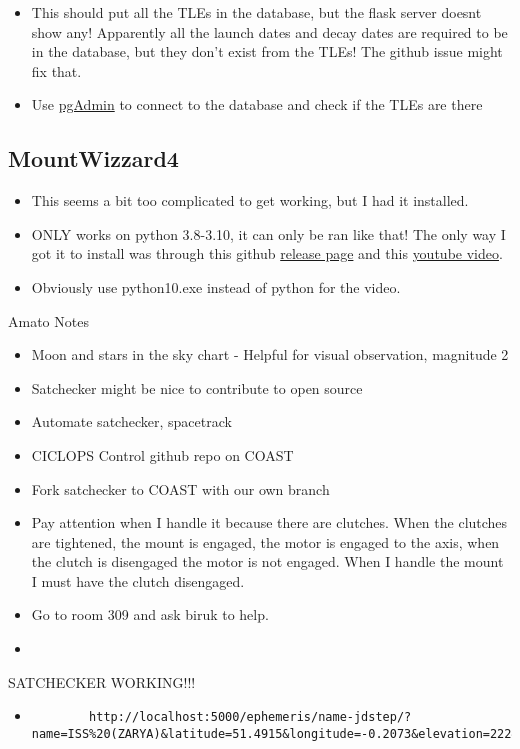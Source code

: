 \documentclass[../main.tex]{subfiles}
\begin{document}
\begin{itemize}
\begin{enumerate}
        \item In one terminal instance (I was using powershell) run \verb|$env:PYTHONPATH = "C:\...Yourpath...\satchecker\src"|
        \item Then run \verb|flask run| 
    \end{enumerate}
    \item This should put all the TLEs in the database, but the flask server doesnt show any! Apparently all the launch dates and decay dates are required to be in the database, but they don't exist from the TLEs! The github issue might fix that.
    \item Use \href{https://www.pgadmin.org/}{pgAdmin} to connect to the database and check if the TLEs are there
\end{itemize}
\subsection{MountWizzard4}
\begin{itemize}
    \item This seems a bit too complicated to get working, but I had it installed.
    \item ONLY works on python 3.8-3.10, it can only be ran like that! The only way I got it to install was through this github \href{https://github.com/mworion/InstallerMW4/releases}{release page} and this \href{https://www.youtube.com/watch?v=Tzob8ZSnMH0}{youtube video}.
    \item Obviously use python10.exe instead of python for the video.
    \end{itemize}

    Amato Notes
    \begin{itemize}
        \item Moon and stars in the sky chart - Helpful for visual observation, magnitude 2
        \item Satchecker might be nice to contribute to open source
        \item Automate satchecker, spacetrack
        \item CICLOPS Control github repo on COAST
        \item Fork satchecker to COAST with our own branch
        \item Pay attention when I handle it because there are clutches. When the clutches are tightened, the mount is engaged, the motor is engaged to the axis, when the clutch is disengaged the motor is not engaged. When I handle the mount I must have the clutch disengaged.
        \item Go to room 309 and ask biruk to help.
        \item 
\end{itemize}
SATCHECKER WORKING!!!
\begin{itemize}
    \item \begin{lstlisting}
        http://localhost:5000/ephemeris/name-jdstep/?name=ISS%20(ZARYA)&latitude=51.4915&longitude=-0.2073&elevation=222&startjd=2460871&stopjd=2460872&stepjd=0.01
    \end{lstlisting}
\end{itemize}
\end{document}
